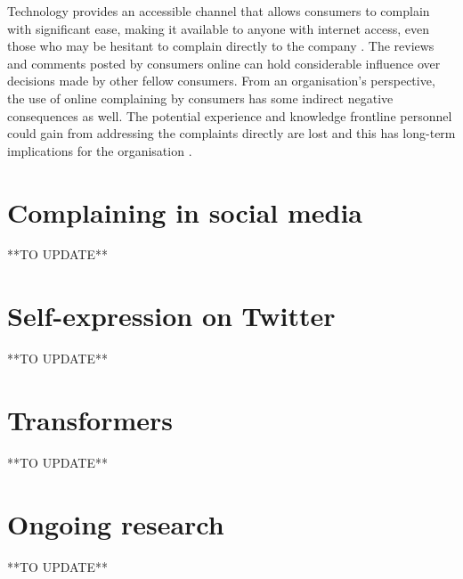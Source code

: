 \newline \newline
Technology provides an accessible channel that allows consumers to complain with significant ease, making it available to anyone with internet access, even those who may be hesitant to complain directly to the company \cite{sparksComplainingCyberspaceMotives2010}. The reviews and comments posted by consumers online can hold considerable influence over decisions made by other fellow consumers. From an organisation's perspective, the use of online complaining by consumers has some indirect negative consequences as well. The potential experience and knowledge frontline personnel could gain from addressing the complaints directly are lost and this has long-term implications for the organisation \cite{sparksComplainingCyberspaceMotives2010}.

\section{Complaining in social media}
**TO UPDATE**

\section{Self-expression on Twitter}
**TO UPDATE**

\section{Transformers}
**TO UPDATE**

\section{Ongoing research}
**TO UPDATE**